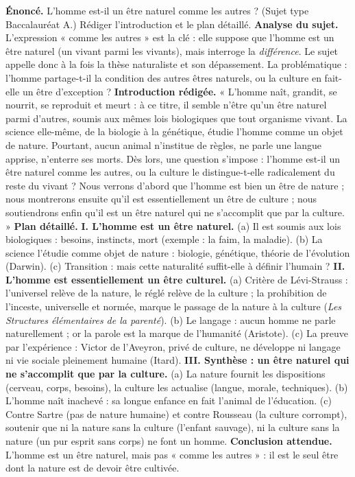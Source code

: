 \documentclass[11pt]{article}
\begin{document}
\begin{exoresolu}
\textbf{Énoncé.} L'homme est-il un être naturel comme les autres ? (Sujet type Baccalauréat A.) Rédiger l'introduction et le plan détaillé.
\tcblower
\textbf{Analyse du sujet.} L'expression « comme les autres » est la clé : elle suppose que l'homme est un être naturel (un vivant parmi les vivants), mais interroge la \emph{différence}. Le sujet appelle donc à la fois la thèse naturaliste et son dépassement. La problématique : l'homme partage-t-il la condition des autres êtres naturels, ou la culture en fait-elle un être d'exception ?
\textbf{Introduction rédigée.} « L'homme naît, grandit, se nourrit, se reproduit et meurt : à ce titre, il semble n'être qu'un être naturel parmi d'autres, soumis aux mêmes lois biologiques que tout organisme vivant. La science elle-même, de la biologie à la génétique, étudie l'homme comme un objet de nature. Pourtant, aucun animal n'institue de règles, ne parle une langue apprise, n'enterre ses morts. Dès lors, une question s'impose : l'homme est-il un être naturel comme les autres, ou la culture le distingue-t-elle radicalement du reste du vivant ? Nous verrons d'abord que l'homme est bien un être de nature ; nous montrerons ensuite qu'il est essentiellement un être de culture ; nous soutiendrons enfin qu'il est un être naturel qui ne s'accomplit que par la culture. »
\textbf{Plan détaillé.}
\textbf{I. L'homme est un être naturel.} (a) Il est soumis aux lois biologiques : besoins, instincts, mort (exemple : la faim, la maladie). (b) La science l'étudie comme objet de nature : biologie, génétique, théorie de l'évolution (Darwin). (c) Transition : mais cette naturalité suffit-elle à définir l'humain ?
\textbf{II. L'homme est essentiellement un être culturel.} (a) Critère de Lévi-Strauss : l'universel relève de la nature, le réglé relève de la culture ; la prohibition de l'inceste, universelle et normée, marque le passage de la nature à la culture (\emph{Les Structures élémentaires de la parenté}). (b) Le langage : aucun homme ne parle naturellement ; or la parole est la marque de l'humanité (Aristote). (c) La preuve par l'expérience : Victor de l'Aveyron, privé de culture, ne développe ni langage ni vie sociale pleinement humaine (Itard).
\textbf{III. Synthèse : un être naturel qui ne s'accomplit que par la culture.} (a) La nature fournit les dispositions (cerveau, corps, besoins), la culture les actualise (langue, morale, techniques). (b) L'homme naît inachevé : sa longue enfance en fait l'animal de l'éducation. (c) Contre Sartre (pas de nature humaine) et contre Rousseau (la culture corrompt), soutenir que ni la nature sans la culture (l'enfant sauvage), ni la culture sans la nature (un pur esprit sans corps) ne font un homme.
\textbf{Conclusion attendue.} L'homme est un être naturel, mais pas « comme les autres » : il est le seul être dont la nature est de devoir être cultivée.
\end{exoresolu}
\end{document}
